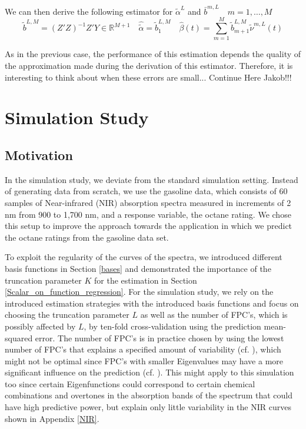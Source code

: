 \documentclass[11pt,twoside,a4paper]{article}
\begin{document}
	We can then derive the following estimator for $\tilde{\alpha}^L$ and $\bar{b}^{m,L} \quad m = 1, \dots, M$
	\begin{equation}
		\tilde{b}^{L,M} = \left(Z'Z\right)^{-1}Z'Y \in \mathbb{R}^{M+1} \quad \hat{\tilde{\alpha}} = \tilde{b}_{1}^{L,M} \quad \hat{\beta}(t) = \sum_{m = 1}^{M} \tilde{b}_{m + 1}^{L,M} \tilde{\nu}^{m,L}(t)
	\end{equation}

	As in the previous case, the performance of this estimation depends the quality of the approximation made during the derivation of this estimator. Therefore, it is interesting to think about when these errors are small... {\color{red}Continue Here Jakob!!!}

	\nocite{alexanderian_KLexpansion_2015}
	\nocite{kokoszka_introduction_2017}
	\nocite{hsing_theoretical_2015}
	\nocite{ramsay_functional_2005}
	\nocite{horvath_inference_2012}
	\nocite{cai_prediction_2006}
	\nocite{levitin_introduction_2007}

	\section{Simulation Study}\label{Simulation}

	\subsection{Motivation}\label{sim_motivation}
	
	In the simulation study, we deviate from the standard simulation setting. Instead of generating data from scratch, we use the gasoline data, which consists of 60 samples of Near-infrared (NIR) absorption spectra measured in increments of 2 nm from 900 to 1,700 nm, and a response variable, the octane rating. We chose this setup to improve the approach towards the application in which we predict the octane ratings from the gasoline data set.	
	
	To exploit the regularity of the curves of the spectra, we introduced different basis functions in Section \ref{bases} and demonstrated the importance of the truncation parameter $K$ for the estimation in Section \ref{Scalar_on_function_regression}. For the simulation study, we rely on the introduced estimation strategies with the introduced basis functions and focus on choosing the truncation parameter $L$ as well as the number of FPC's, which is possibly affected by $L$, by ten-fold cross-validation using the prediction mean-squared error. The number of FPC's is in practice chosen by using the lowest number of FPC's that explains a specified amount of variability (cf. \cite{kokoszka_introduction_2017}), which might not be optimal since FPC's with smaller Eigenvalues may have a more significant influence on the prediction (cf. \cite{Jolliffe_1982}). This might apply to this simulation too since certain Eigenfunctions could correspond to certain chemical combinations and overtones in the absorption bands of the spectrum that could have high predictive power, but explain only little variability in the NIR curves shown in Appendix \ref{NIR}.\\
	 
\end{document}
